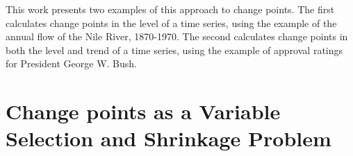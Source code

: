 This work presents two examples of this approach to change points.
The first calculates change points in the level of a time series, using the example of the annual flow of the Nile River, 1870-1970.
The second calculates change points in both the level and trend of a time series, using the example of approval ratings for President George W. Bush.




\section{Change points as a Variable Selection and Shrinkage Problem}
\label{dlm:sec:chang-as-vari}

